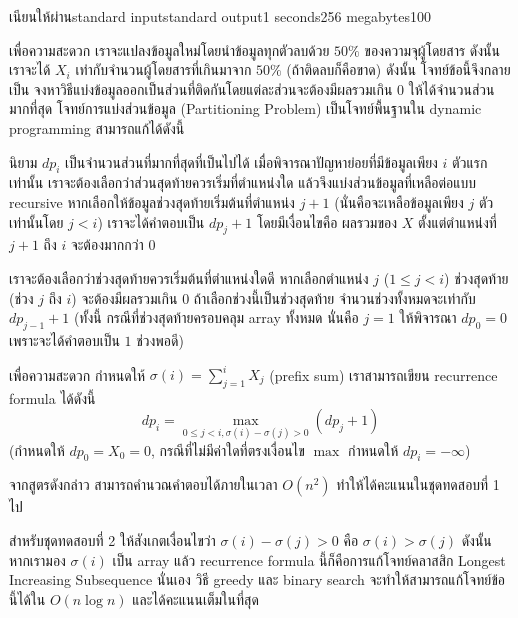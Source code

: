 \documentclass[11pt,a4paper]{article}
\begin{document}
\begin{problem}{เนียนให้ผ่าน}{standard input}{standard output}{1 seconds}{256 megabytes}{100}

เพื่อความสะดวก เราจะแปลงข้อมูลใหม่โดยนำข้อมูลทุกตัวลบด้วย $50\%$ ของความจุผู้โดยสาร ดังนั้นเราจะได้ $X_i$ เท่ากับจำนวนผู้โดยสารที่เกินมาจาก $50\%$ (ถ้าติดลบก็คือขาด) ดังนั้น โจทย์ข้อนี้จึงกลายเป็น จงหาวิธีแบ่งข้อมูลออกเป็นส่วนที่ติดกันโดยแต่ละส่วนจะต้องมีผลรวมเกิน $0$ ให้ได้จำนวนส่วนมากที่สุด โจทย์การแบ่งส่วนข้อมูล (Partitioning Problem) เป็นโจทย์พื้นฐานใน dynamic programming สามารถแก้ได้ดังนี้

นิยาม $dp_i$ เป็นจำนวนส่วนที่มากที่สุดที่เป็นไปได้ เมื่อพิจารณาปัญหาย่อยที่มีข้อมูลเพียง $i$ ตัวแรกเท่านั้น
เราจะต้องเลือกว่าส่วนสุดท้ายควรเริ่มที่ตำแหน่งใด แล้วจึงแบ่งส่วนข้อมูลที่เหลือต่อแบบ recursive
หากเลือกให้ข้อมูลช่วงสุดท้ายเริ่มต้นที่ตำแหน่ง $j+1$ (นั่นคือจะเหลือข้อมูลเพียง $j$ ตัวเท่านั้นโดย $j < i$) เราจะได้คำตอบเป็น $dp_j+1$ โดยมีเงื่อนไขคือ ผลรวมของ $X$ ตั้งแต่ตำแหน่งที่ $j+1$ ถึง $i$ จะต้องมากกว่า $0$

เราจะต้องเลือกว่าช่วงสุดท้ายควรเริ่มต้นที่ตำแหน่งใดดี หากเลือกตำแหน่ง $j$ ($1 \leq j < i$) ช่วงสุดท้าย (ช่วง $j$ ถึง $i$) จะต้องมีผลรวมเกิน $0$ ถ้าเลือกช่วงนี้เป็นช่วงสุดท้าย จำนวนช่วงทั้งหมดจะเท่ากับ $dp_{j-1}+1$ (ทั้งนี้ กรณีที่ช่วงสุดท้ายครอบคลุม array ทั้งหมด นั่นคือ $j=1$ ให้พิจารณา $dp_0 = 0$ เพราะจะได้คำตอบเป็น $1$ ช่วงพอดี)

เพื่อความสะดวก กำหนดให้ $\sigma(i) = \sum_{j=1}^{i} X_j$ (prefix sum) เราสามารถเขียน recurrence formula ได้ดังนี้
$$dp_i = \max_{0 \leq j < i, \sigma(i)-\sigma(j) > 0} \left( dp_j + 1 \right)$$
(กำหนดให้ $dp_0 = X_0 = 0$, กรณีที่ไม่มีค่าใดที่ตรงเงื่อนไข $\max$ กำหนดให้ $dp_i = -\infty$)

จากสูตรดังกล่าว สามารถคำนวณคำตอบได้ภายในเวลา $O(n^2)$ ทำให้ได้คะแนนในชุดทดสอบที่ 1 ไป

สำหรับชุดทดสอบที่ 2 ให้สังเกตเงื่อนไขว่า $\sigma(i)-\sigma(j) > 0$ คือ $\sigma(i)>\sigma(j)$ ดังนั้น หากเรามอง $\sigma(i)$ เป็น array แล้ว recurrence formula นี้ก็คือการแก้โจทย์คลาสสิก Longest Increasing Subsequence นั่นเอง วิธี greedy และ binary search จะทำให้สามารถแก้โจทย์ข้อนี้ได้ใน $O(n \log n)$ และได้คะแนนเต็มในที่สุด

\end{problem}

\pagebreak
\end{document}
